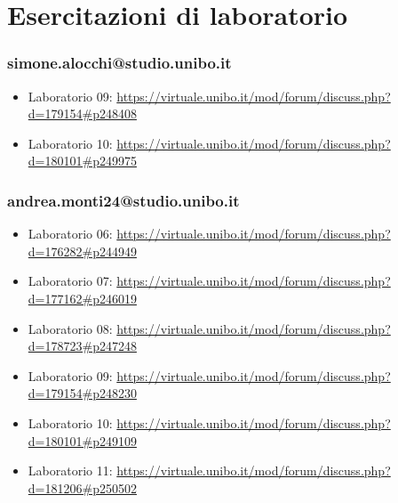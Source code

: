 \documentclass[a4paper,12pt]{report}
\begin{document}
\chapter{Esercitazioni di laboratorio}

\subsection{simone.alocchi@studio.unibo.it}

\begin{itemize}
 \item Laboratorio 09: \url{https://virtuale.unibo.it/mod/forum/discuss.php?d=179154#p248408}
 \item Laboratorio 10: \url{https://virtuale.unibo.it/mod/forum/discuss.php?d=180101#p249975}
\end{itemize}

\subsection{andrea.monti24@studio.unibo.it}

\begin{itemize}
 \item Laboratorio 06: \url{https://virtuale.unibo.it/mod/forum/discuss.php?d=176282#p244949}
 \item Laboratorio 07: \url{https://virtuale.unibo.it/mod/forum/discuss.php?d=177162#p246019}
 \item Laboratorio 08: \url{https://virtuale.unibo.it/mod/forum/discuss.php?d=178723#p247248}
 \item Laboratorio 09: \url{https://virtuale.unibo.it/mod/forum/discuss.php?d=179154#p248230}
 \item Laboratorio 10: \url{https://virtuale.unibo.it/mod/forum/discuss.php?d=180101#p249109}
 \item Laboratorio 11: \url{https://virtuale.unibo.it/mod/forum/discuss.php?d=181206#p250502}
\end{itemize}
\end{document}

